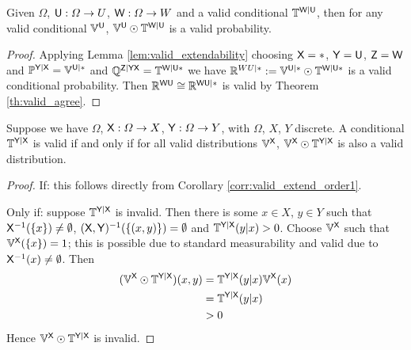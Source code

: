 \begin{corollary}\label{corr:valid_extend_order1}
Given $\Omega$, $\mathsf{U}:\Omega\to U$, $\mathsf{W}:\Omega\to W$ and a valid conditional $\mathbb{T}^{\mathsf{W}|\mathsf{U}}$, then for any valid conditional $\mathbb{V}^{\mathsf{U}}$, $\mathbb{V}^{\mathsf{U}}\odot \mathbb{T}^{\mathsf{W}|\mathsf{U}}$ is a valid probability.
\end{corollary}

\begin{proof}
Applying Lemma \ref{lem:valid_extendability} choosing $\mathsf{X}=*$, $\mathsf{Y}=\mathsf{U}$, $\mathsf{Z}=\mathsf{W}$ and $\mathbb{P}^{\mathsf{Y}|\mathsf{X}}=\mathbb{V}^{\mathsf{U}|*}$ and $\mathbb{Q}^{\mathsf{Z}|\mathsf{YX}}=\mathbb{T}^{\mathsf{W}|\mathsf{U*}}$ we have $\mathbb{R}^{WU|*}:=\mathbb{V}^{\mathsf{U}|*}\odot \mathbb{T}^{\mathsf{W}|\mathsf{U}*}$ is a valid conditional probability. Then $\mathbb{R}^{\mathsf{WU}}\cong \mathbb{R}^{\mathsf{WU}|*}$ is valid by Theorem \ref{th:valid_agree}.
\end{proof}

\begin{theorem}\label{th:valid_conditional_probability}
Suppose we have $\Omega$, $\mathsf{X}:\Omega\to X$, $\mathsf{Y}:\Omega\to Y$, with $\Omega$, $X$, $Y$ discrete. A conditional $\mathbb{T}^{\mathsf{Y}|\mathsf{X}}$ is valid if and only if for all valid distributions $\mathbb{V}^{\mathsf{X}}$, $\mathbb{V}^{\mathsf{X}}\odot \mathbb{T}^{\mathsf{Y}|\mathsf{X}}$ is also a valid distribution.
\end{theorem}

\begin{proof}
If: this follows directly from Corollary \ref{corr:valid_extend_order1}.

Only if: suppose $\mathbb{T}^{\mathsf{Y}|\mathsf{X}}$ is invalid. Then there is some $x\in X$, $y\in Y$ such that $\mathsf{X}^{-1}(\{x\})\neq \emptyset$, $(\mathsf{X},\mathsf{Y})^{-1}(\{(x,y)\})=\emptyset$ and $\mathbb{T}^{\mathsf{Y}|\mathsf{X}}(y|x)>0$. Choose $\mathbb{V}^{\mathsf{X}}$ such that $\mathbb{V}^{\mathsf{X}}(\{x\})=1$; this is possible due to standard measurability and valid due to $\mathsf{X}^{-1}(x)\neq \emptyset$. Then
\begin{align}
    (\mathbb{V}^{\mathsf{X}}\odot \mathbb{T}^{\mathsf{Y}|\mathsf{X}})(x,y) &= \mathbb{T}^{\mathsf{Y}|\mathsf{X}}(y|x) \mathbb{V}^{\mathsf{X}}(x)\\
                                                                     &= \mathbb{T}^{\mathsf{Y}|\mathsf{X}}(y|x)\\
                                                                     &>0
\end{align}
Hence $\mathbb{V}^{\mathsf{X}}\odot \mathbb{T}^{\mathsf{Y}|\mathsf{X}}$ is invalid.
\end{proof}


